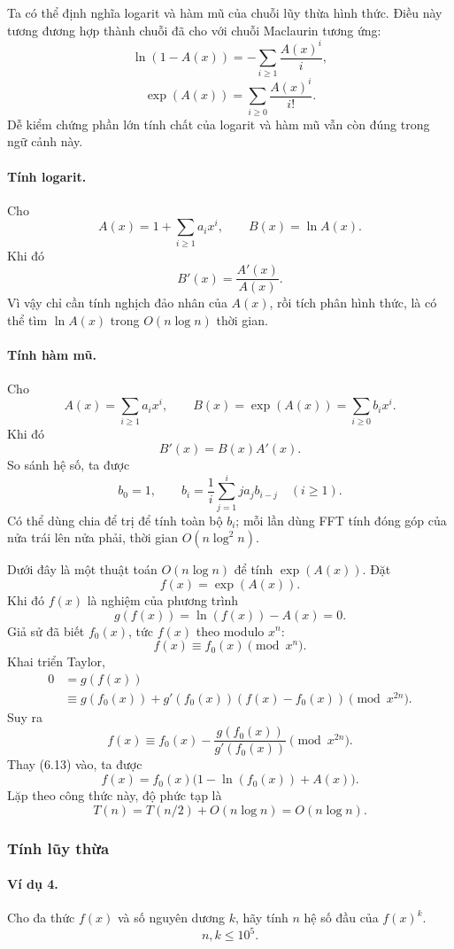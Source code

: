 \documentclass[11pt]{article}
\begin{document}
Ta có thể định nghĩa logarit và hàm mũ của chuỗi lũy thừa hình thức. Điều này
tương đương hợp thành chuỗi đã cho với chuỗi Maclaurin tương ứng:
\[
  \ln(1-A(x))=-\sum_{i\ge 1}\frac{A(x)^i}{i}, \tag{6.8}
\]
\[
  \exp(A(x))=\sum_{i\ge 0}\frac{A(x)^i}{i!}. \tag{6.9}
\]
Dễ kiểm chứng phần lớn tính chất của logarit và hàm mũ vẫn còn đúng trong ngữ
cảnh này.

\paragraph{Tính logarit.}
Cho
\[
  A(x)=1+\sum_{i\ge 1}a_i x^i,\qquad B(x)=\ln A(x).
\]
Khi đó
\[
  B'(x)=\frac{A'(x)}{A(x)}. \tag{6.10}
\]
Vì vậy chỉ cần tính nghịch đảo nhân của \(A(x)\), rồi tích phân hình thức, là
có thể tìm \(\ln A(x)\) trong \(O(n\log n)\) thời gian.

\paragraph{Tính hàm mũ.}
Cho
\[
  A(x)=\sum_{i\ge 1}a_i x^i,\qquad
  B(x)=\exp(A(x))=\sum_{i\ge 0}b_i x^i.
\]
Khi đó
\[
  B'(x)=B(x)A'(x). \tag{6.11}
\]
So sánh hệ số, ta được
\[
  b_0=1,\qquad
  b_i=\frac1i\sum_{j=1}^i j a_j b_{i-j}\quad (i\ge 1). \tag{6.12}
\]
Có thể dùng chia để trị để tính toàn bộ \(b_i\); mỗi lần dùng FFT tính đóng góp
của nửa trái lên nửa phải, thời gian \(O(n\log^2 n)\).

Dưới đây là một thuật toán \(O(n\log n)\) để tính \(\exp(A(x))\). Đặt
\[
  f(x)=\exp(A(x)).
\]
Khi đó \(f(x)\) là nghiệm của phương trình
\[
  g(f(x))=\ln(f(x))-A(x)=0. \tag{6.13}
\]
Giả sử đã biết \(f_0(x)\), tức \(f(x)\) theo modulo \(x^n\):
\[
  f(x)\equiv f_0(x)\pmod{x^n}. \tag{6.14}
\]
Khai triển Taylor,
\[
\begin{aligned}
  0&=g(f(x))\\
   &\equiv g(f_0(x))+g'(f_0(x))(f(x)-f_0(x))\pmod{x^{2n}}.
\end{aligned}
\]
Suy ra
\[
  f(x)\equiv f_0(x)-\frac{g(f_0(x))}{g'(f_0(x))}\pmod{x^{2n}}. \tag{6.15}
\]
Thay (6.13) vào, ta được
\[
  f(x)=f_0(x)\bigl(1-\ln(f_0(x))+A(x)\bigr). \tag{6.16}
\]
Lặp theo công thức này, độ phức tạp là
\[
  T(n)=T(n/2)+O(n\log n)=O(n\log n).
\]

\subsubsection{Tính lũy thừa}

\paragraph{Ví dụ 4.}
Cho đa thức \(f(x)\) và số nguyên dương \(k\), hãy tính \(n\) hệ số đầu của
\(f(x)^k\).
\[
  n,k\le 10^5.
\]
\end{document}
